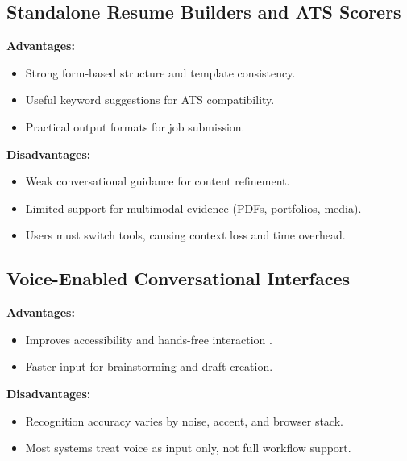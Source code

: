 \documentclass[conference]{IEEEtran}
\begin{document}
\subsection{Standalone Resume Builders and ATS Scorers}
\textbf{Advantages:}
\begin{itemize}
    \item Strong form-based structure and template consistency.
    \item Useful keyword suggestions for ATS compatibility.
    \item Practical output formats for job submission.
\end{itemize}
\textbf{Disadvantages:}
\begin{itemize}
    \item Weak conversational guidance for content refinement.
    \item Limited support for multimodal evidence (PDFs, portfolios, media).
    \item Users must switch tools, causing context loss and time overhead.
\end{itemize}

\subsection{Voice-Enabled Conversational Interfaces}
\textbf{Advantages:}
\begin{itemize}
    \item Improves accessibility and hands-free interaction \cite{pradhan2018}.
    \item Faster input for brainstorming and draft creation.
\end{itemize}
\textbf{Disadvantages:}
\begin{itemize}
    \item Recognition accuracy varies by noise, accent, and browser stack.
    \item Most systems treat voice as input only, not full workflow support.
\end{itemize}
\end{document}
